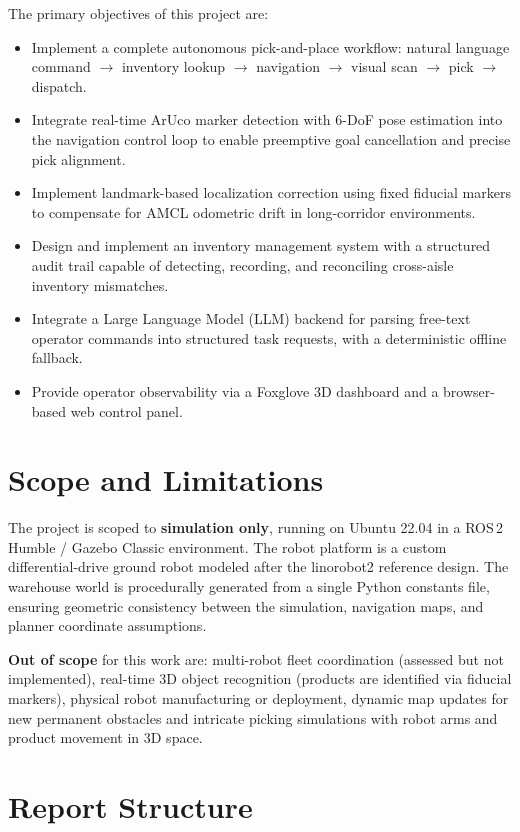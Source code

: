 \documentclass[12pt,a4paper]{report}
\begin{document}
The primary objectives of this project are:

\begin{itemize}
    \item Implement a complete autonomous pick-and-place workflow: natural language command $\rightarrow$ inventory lookup $\rightarrow$ navigation $\rightarrow$ visual scan $\rightarrow$ pick $\rightarrow$ dispatch.
    \item Integrate real-time ArUco marker detection with 6-DoF pose estimation into the navigation control loop to enable preemptive goal cancellation and precise pick alignment.
    \item Implement landmark-based localization correction using fixed fiducial markers to compensate for AMCL odometric drift in long-corridor environments.
    \item Design and implement an inventory management system with a structured audit trail capable of detecting, recording, and reconciling cross-aisle inventory mismatches.
    \item Integrate a Large Language Model (LLM) backend for parsing free-text operator commands into structured task requests, with a deterministic offline fallback.
    \item Provide operator observability via a Foxglove 3D dashboard and a browser-based web control panel.
\end{itemize}

\section{Scope and Limitations}

The project is scoped to \textbf{simulation only}, running on Ubuntu 22.04 in a ROS\,2 Humble / Gazebo Classic environment. The robot platform is a custom differential-drive ground robot modeled after the linorobot2 reference design. The warehouse world is procedurally generated from a single Python constants file, ensuring geometric consistency between the simulation, navigation maps, and planner coordinate assumptions.

\textbf{Out of scope} for this work are: multi-robot fleet coordination (assessed but not implemented), real-time 3D object recognition (products are identified via fiducial markers), physical robot manufacturing or deployment, dynamic map updates for new permanent obstacles and intricate picking simulations with robot arms and product movement in 3D space.

\section{Report Structure}
\end{document}
